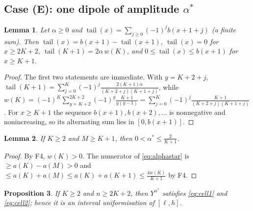 \documentclass[11pt]{amsart}
\newtheorem{lemma}{Lemma}[section]
\newtheorem{proposition}[lemma]{Proposition}
\theoremstyle{definition}
\theoremstyle{remark}
\numberwithin{equation}{section}
\newcommand{\tail}{\operatorname{tail}}
\begin{document}
\subsection{Case (E): one dipole of amplitude \texorpdfstring{$\alpha^*$}{alpha*}}

\begin{lemma}\label{lem:tail}
Let $\alpha\ge0$ and $\tail(x)=\sum_{j\ge0}(-1)^jb(x+1+j)$ (a finite sum). Then
$\tail(x)=b(x+1)-\tail(x+1)$, $\tail(x)=0$ for $x\ge2K+2$, $\tail(K+1)=2\alpha\,w(K)$, and
$0\le\tail(x)\le b(x+1)$ for $x\ge K+1$.
\end{lemma}

\begin{proof}
The first two statements are immediate. With $y=K+2+j$,
$\tail(K+1)=\sum_{j=0}^{K}(-1)^j\frac{2(K+1)\alpha}{(K+2+j)(K+1+j)}$, while
$w(K)=(-1)^K\sum_{y=K+2}^{2K+2}(-1)^y\frac{K+1}{y(y-1)}=\sum_{j=0}^{K}(-1)^j\frac{K+1}{(K+2+j)(K+1+j)}$.
For $x\ge K+1$ the sequence $b(x+1),b(x+2),\dots$ is nonnegative and nonincreasing, so its alternating
sum lies in $[0,b(x+1)]$.
\end{proof}

\begin{lemma}\label{lem:alphastar}
If $K\ge2$ and $M\ge K+1$, then $0<\alpha^*\le\frac2{K+1}$.
\end{lemma}

\begin{proof}
By F4, $w(K)>0$. The numerator of \eqref{eq:alphastar} is $\ge a(K)-a(M)>0$ and
$\le a(K)+a(M)\le a(K)+a(K+1)\le\frac{4w(K)}{K+1}$ by F4.
\end{proof}

\begin{proposition}\label{prop:caseE}
If $K\ge2$ and $n\ge2K+2$, then $Y^{\alpha^*}$ satisfies \eqref{eq:cell1} and \eqref{eq:cell2}; hence it
is an interval uniformisation of $[\ell,h]$.
\end{proposition}
\end{document}
